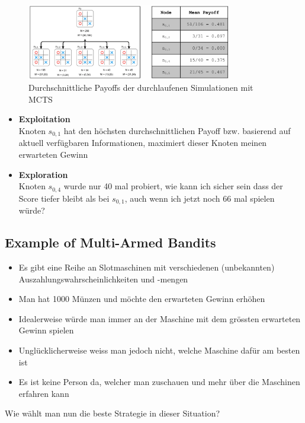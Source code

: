 \documentclass[a4paper]{article}
\begin{document}
		\begin{figure}[htb!]
			\centering
			\includegraphics[width=0.8\textwidth]{img/02_mcts/selection_policy.png}
			\caption{Durchschnittliche Payoffs der durchlaufenen Simulationen mit MCTS}
			\label{fig:02_mcts_selection_policy}
		\end{figure}
		
		\begin{itemize}
			\item \textbf{Exploitation} \\
			Knoten $s_{0,1}$ hat den höchsten durchschnittlichen Payoff bzw. basierend auf aktuell verfügbaren Informationen, maximiert dieser Knoten meinen erwarteten Gewinn
			\item \textbf{Exploration} \\
			Knoten $s_{0,4}$ wurde nur 40 mal probiert, wie kann ich sicher sein dass der Score tiefer bleibt als bei $s_{0,1}$, auch wenn ich jetzt noch 66 mal spielen würde?
		\end{itemize}
	
		\subsection{Example of Multi-Armed Bandits}
		
		\begin{itemize}
			\item Es gibt eine Reihe an Slotmaschinen mit verschiedenen (unbekannten) Auszahlungswahrscheinlichkeiten und -mengen
			\item Man hat 1000 Münzen und möchte den erwarteten Gewinn erhöhen
			\item Idealerweise würde man immer an der Maschine mit dem grössten erwarteten Gewinn spielen
			\item Unglücklicherweise weiss man jedoch nicht, welche Maschine dafür am besten ist
			\item Es ist keine Person da, welcher man zuschauen und mehr über die Maschinen erfahren kann
		\end{itemize}
		\vspace{1em}
		Wie wählt man nun die beste Strategie in dieser Situation?
	
\end{document}
